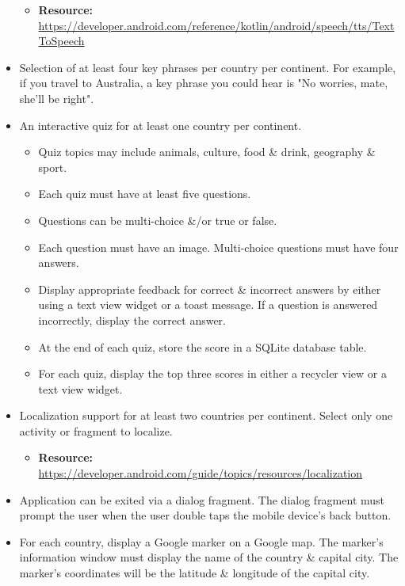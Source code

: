 \documentclass{article}
\begin{document}
\begin{itemize}
\begin{itemize}
        \item \textbf{Resource:} \footnotesize\href{https://developer.android.com/reference/kotlin/android/speech/tts/TextToSpeech}{https://developer.android.com/reference/kotlin/android/speech/tts/TextToSpeech} 
    \end{itemize}
    \item Selection of at least four key phrases per country per continent. For example, if you travel to Australia, a key phrase you could hear is "No worries, mate, she'll be right".
    \item An interactive quiz for at least one country per continent.
    \begin{itemize}
        \item Quiz topics may include animals, culture, food \& drink, geography \& sport.
        \item Each quiz must have at least five questions.
        \item Questions can be multi-choice \&/or true or false.
        \item Each question must have an image. Multi-choice questions must have four answers.
        \item Display appropriate feedback for correct \& incorrect answers by either using a text view widget or a toast message. If a question is answered incorrectly, display the correct answer.
        \item At the end of each quiz, store the score in a SQLite database table. 
        \item For each quiz, display the top three scores in either a recycler view or a text view widget.
    \end{itemize}
    \item Localization support for at least two countries per continent. Select only one activity or fragment to localize.
    \begin{itemize}
        \item \textbf{Resource:} \footnotesize\href{https://developer.android.com/guide/topics/resources/localization/}{https://developer.android.com/guide/topics/resources/localization}
    \end{itemize}
    \item Application can be exited via a dialog fragment. The dialog fragment must prompt the user when the user double taps the mobile device's back button.
    \item For each country, display a Google marker on a Google map. The marker's information window must display the name of the country \& capital city. The marker's coordinates will be the latitude \& longitude of the capital city.

\end{itemize}
\end{document}
